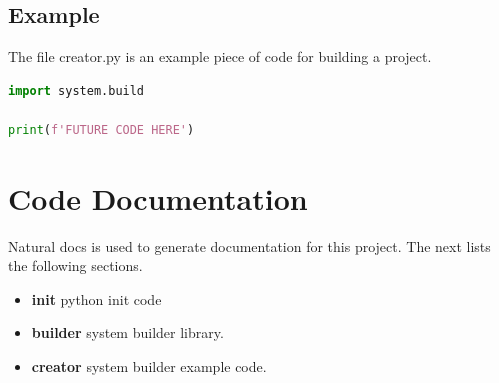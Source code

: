 \subsection{Example}
\par
The file creator.py is an example piece of code for building a project.
\begin{lstlisting}[language=Python]
import system.build

print(f'FUTURE CODE HERE')

\end{lstlisting}

\section{Code Documentation} \label{Code Documentation}

\par
Natural docs is used to generate documentation for this project. The next lists the following sections.

\begin{itemize}
\item \textbf{init} python init code\\
\item \textbf{builder} system builder library.\\
\item \textbf{creator} system builder example code.\\
\end{itemize}

